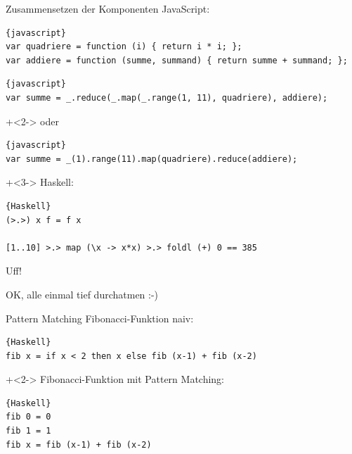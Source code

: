 \begin{frame}[fragile]{Zusammensetzen der Komponenten}
JavaScript:
\begin{lstlisting}{javascript}
var quadriere = function (i) { return i * i; };
var addiere = function (summe, summand) { return summe + summand; };
\end{lstlisting}

\begin{lstlisting}{javascript}
var summe = _.reduce(_.map(_.range(1, 11), quadriere), addiere);
\end{lstlisting}

\onslide+<2->
oder

\begin{lstlisting}{javascript}
var summe = _(1).range(11).map(quadriere).reduce(addiere);
\end{lstlisting}

\onslide+<3->
Haskell:
\begin{lstlisting}{Haskell}
(>.>) x f = f x

[1..10] >.> map (\x -> x*x) >.> foldl (+) 0 == 385
\end{lstlisting}

\end{frame}

\begin{frame}[fragile]{Uff!}

\begin{center}
\Large
OK, alle einmal tief durchatmen :-)
\end{center}

\end{frame}

\begin{frame}[fragile]{Pattern Matching}
Fibonacci-Funktion \glqq naiv\grqq{}:
\begin{lstlisting}{Haskell}
fib x = if x < 2 then x else fib (x-1) + fib (x-2)
\end{lstlisting}

\onslide+<2->
\vfill
Fibonacci-Funktion mit Pattern Matching:
\begin{lstlisting}{Haskell}
fib 0 = 0
fib 1 = 1
fib x = fib (x-1) + fib (x-2)
\end{lstlisting}
\end{frame}

